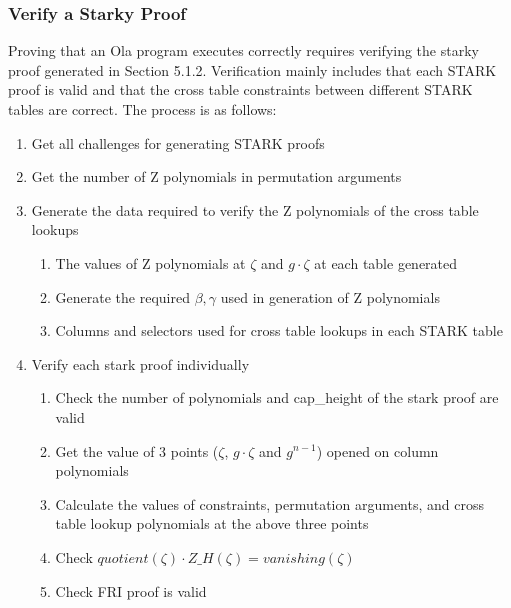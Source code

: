 \subsubsection{Verify a Starky Proof}\label{section: starky-verify-proof}

Proving that an Ola program executes correctly requires verifying the starky proof generated in Section 5.1.2. Verification mainly includes that each STARK proof is valid and that the cross table constraints between different STARK tables are correct. The process is as follows:

\begin{enumerate}
    \item Get all challenges for generating STARK proofs
    \item Get the number of Z polynomials  in permutation arguments
    \item Generate the data required to verify the Z polynomials of the cross table lookups
        \begin{enumerate}
            \item The values of Z polynomials at $\zeta$ and $g \cdot \zeta$ at each table generated
            \item Generate the required $\beta, \gamma$ used in generation of Z polynomials
            \item Columns and selectors used for cross table lookups in each STARK table
        \end{enumerate}
    \item Verify each stark proof individually
        \begin{enumerate}
            \item Check the number of polynomials and cap\_height of the stark proof are valid
            \item Get the value of 3 points ($\zeta$, $g \cdot \zeta$ and $g^{n-1}$) opened on column polynomials
            \item Calculate the values of constraints, permutation arguments, and cross table lookup polynomials at the above three points
            \item Check $quotient(\zeta) \cdot Z\_H(\zeta) = vanishing(\zeta)$
            \item Check FRI proof is valid
        \end{enumerate}
\end{enumerate}
